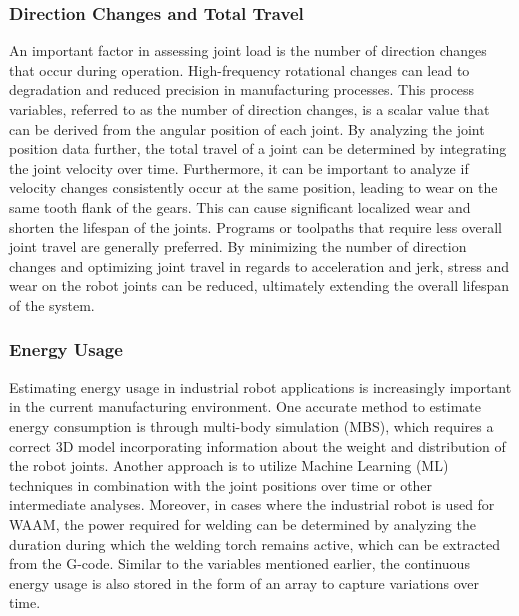 \documentclass[conference]{IEEEtran}
\begin{document}
\subsubsection*{Direction Changes and Total Travel}
An important factor in assessing joint load is the number of direction changes that occur during operation. High-frequency rotational changes can lead to degradation and reduced precision in manufacturing processes. This process variables, referred to as the number of direction changes, is a scalar value that can be derived from the angular position of each joint. By analyzing the joint position data further, the total travel of a joint can be determined by integrating the joint velocity over time. Furthermore, it can be important to analyze if velocity changes consistently occur at the same position, leading to wear on the same tooth flank of the gears. This can cause significant localized wear and shorten the lifespan of the joints. Programs or toolpaths that require less overall joint travel are generally preferred. By minimizing the number of direction changes and optimizing joint travel in regards to acceleration and jerk, stress and wear on the robot joints can be reduced, ultimately extending the overall lifespan of the system.



\subsubsection*{Energy Usage}
Estimating energy usage in industrial robot applications is increasingly important in the current manufacturing environment. One accurate method to estimate energy consumption is through multi-body simulation (MBS), which requires a correct 3D model incorporating information about the weight and distribution of the robot joints. Another approach is to utilize Machine Learning (ML) techniques in combination with the joint positions over time or other intermediate analyses. Moreover, in cases where the industrial robot is used for WAAM, the power required for welding can be determined by analyzing the duration during which the welding torch remains active, which can be extracted from the G-code. Similar to the variables mentioned earlier, the continuous energy usage is also stored in the form of an array to capture variations over time.
\end{document}
